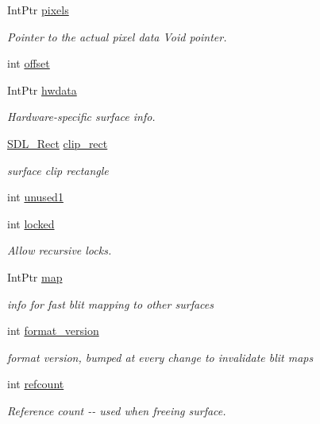 \begin{DoxyCompactItemize}
IntPtr \hyperlink{struct_s_d_l___surface_aec4109250396885d55724d1d90493af8}{pixels}
\begin{DoxyCompactList}\small\item\em Pointer to the actual pixel data Void pointer. \item\end{DoxyCompactList}\item 
int \hyperlink{struct_s_d_l___surface_a6cfa15440f7eaa8b3eab829086e0e2e9}{offset}
\item 
IntPtr \hyperlink{struct_s_d_l___surface_a6da45c19f4069e7f3ff6b9a3a3eb1779}{hwdata}
\begin{DoxyCompactList}\small\item\em Hardware-\/specific surface info. \item\end{DoxyCompactList}\item 
\hyperlink{struct_s_d_l___rect}{SDL\_\-Rect} \hyperlink{struct_s_d_l___surface_a81af31ca468e945890d6ba93743aca4a}{clip\_\-rect}
\begin{DoxyCompactList}\small\item\em surface clip rectangle \item\end{DoxyCompactList}\item 
int \hyperlink{struct_s_d_l___surface_a1a935a28ce9c4367f21ca1c93e1fa510}{unused1}
\item 
int \hyperlink{struct_s_d_l___surface_a7781fdb11c51fd860988f4f3467f6573}{locked}
\begin{DoxyCompactList}\small\item\em Allow recursive locks. \item\end{DoxyCompactList}\item 
IntPtr \hyperlink{struct_s_d_l___surface_a65e3b1ef2108b927d32f1261c9300f17}{map}
\begin{DoxyCompactList}\small\item\em info for fast blit mapping to other surfaces \item\end{DoxyCompactList}\item 
int \hyperlink{struct_s_d_l___surface_a6df25efce6b1921af43cd50e99261a14}{format\_\-version}
\begin{DoxyCompactList}\small\item\em format version, bumped at every change to invalidate blit maps \item\end{DoxyCompactList}\item 
int \hyperlink{struct_s_d_l___surface_a3bc1f5a9735f4eadd6a9f5c149f3afd5}{refcount}
\begin{DoxyCompactList}\small\item\em Reference count -\/-\/ used when freeing surface. \item\end{DoxyCompactList}\end{DoxyCompactItemize}


